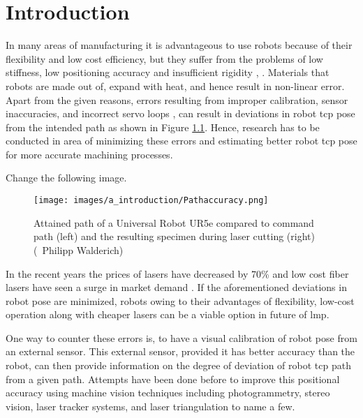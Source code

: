 \chapter{Introduction}\label{Chap:Introduction}

In many areas of manufacturing it is advantageous to use robots because of their flexibility and low cost efficiency, but they suffer from the problems of low stiffness, low positioning accuracy and insufficient rigidity \cite{ji}, \cite{chen}. Materials that robots are made out of, expand with heat, and hence result in non-linear error. Apart from the given reasons, errors resulting from improper calibration, sensor inaccuracies, and incorrect servo loops \cite{greenway}, \cite{torgny} can result in deviations in robot \Gls{tcp} pose from the intended path as shown in Figure \ref{fig:fig_walderich}. Hence, research has to be conducted in area of minimizing these errors and estimating better robot \Gls{tcp} pose for more accurate machining processes.

\vspace{5mm}

\noindent Change the following image.

    \vspace{5mm}
    \begin{figure}[h]
        \hspace{3cm}
        \texttt{[image: images/a\_introduction/Pathaccuracy.png]}
        \caption{Attained path of a Universal Robot UR5e compared to command path (left) and the resulting specimen during laser cutting (right) (\textcopyright \ Philipp Walderich) \cite{img_walderich}}
        \label{fig:fig_walderich}
    \end{figure}
    \vspace{5mm}

    \noindent In the recent years the prices of lasers have decreased by 70\% and low cost fiber lasers have seen a surge in market demand \cite{optech}. If the aforementioned deviations in robot pose are minimized, robots owing to their advantages of flexibility, low-cost operation along with cheaper lasers can be a viable option in future of \gls{lmp}.
    
    \vspace{5mm}

    \noindent One way to counter these errors is, to have a visual calibration of robot pose from an external sensor. This external sensor, provided it has better accuracy than the robot, can then provide information on the degree of deviation of robot \gls{tcp} path from a given path. Attempts have been done before to improve this positional accuracy using machine vision techniques including photogrammetry, stereo vision, laser tracker systems, and laser triangulation to name a few. 
    
